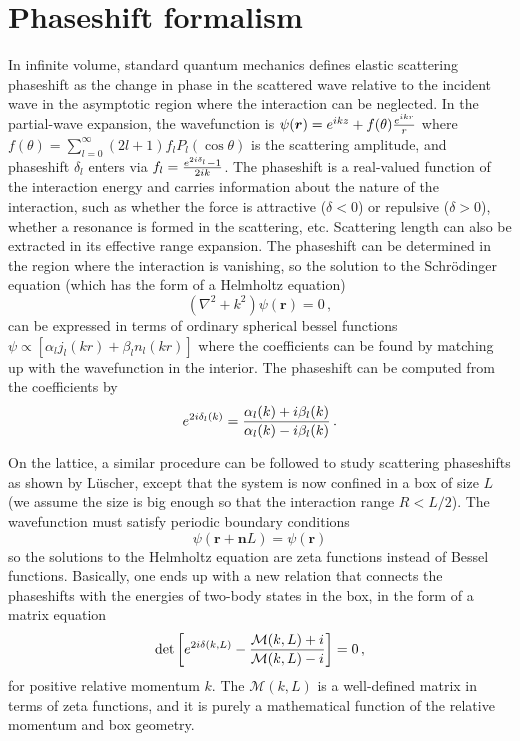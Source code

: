 \documentclass[aps,prd,reprint,showpacs,floatfix,longbibliography,,superscriptaddress]{revtex4-1}
\def\beq{\begin{equation}}
\def\eeq{\end{equation}}
\begin{document}
\section{Phaseshift formalism}

In infinite volume, standard quantum mechanics defines elastic scattering phaseshift as the change in phase 
in the scattered wave relative to the incident wave in the asymptotic region where the interaction can be neglected.
In the partial-wave expansion, the wavefunction is 
$\psi(\bm r) = e^{ikz} + f(\theta) {e^{ikr} \over r}$ where
$f(\theta)=\sum_{l=0}^\infty (2l+1)f_lP_l(\cos\theta)$ is the scattering amplitude, and phaseshift $\delta_l$ enters via $f_l={e^{2i\delta_l}-1 \over 2 i k}$.
The phaseshift is a real-valued function of the interaction energy and carries information about the nature of the interaction, 
such as whether the force is 
attractive ($\delta<0$) or repulsive ($\delta>0$), whether a resonance is formed in the scattering, etc. 
 Scattering length can also be extracted in its effective range expansion.  
The phaseshift can be determined in the region where the interaction is vanishing, so the solution to the 
Schr\"{o}dinger equation (which has the form of a Helmholtz equation)
\beq
(\nabla^2 + k^2) \psi(\bm r)=0\,,
\label{eq:hemholtz}
\eeq
 can be expressed in terms of ordinary spherical bessel functions
$ \psi \propto [   \alpha_l j_l(kr) + \beta_l n_l(kr) ]$ where the coefficients can be found by 
matching up with the wavefunction in the interior.
The phaseshift can be computed from the coefficients by
\beq
e^{2i\delta_l(k)} = {\alpha_l(k) + i \beta_l(k) \over \alpha_l(k) - i \beta_l(k)  }\,.
\eeq

On the lattice, a similar procedure can be followed to study scattering phaseshifts as shown by L\"{u}scher, except that the system is 
now confined in a box of size $L$ (we assume the size is big enough so that  the interaction range $R<L/2$). 
The wavefunction must satisfy periodic boundary conditions 
\beq \psi(\bm r + \bm n L) =\psi(\bm r )\eeq
 so the solutions to 
the Helmholtz equation are zeta functions instead of Bessel functions. 
Basically, one ends up with a new relation that connects the phaseshifts with the
energies of two-body states in the box, 
in the form of a matrix equation~\cite{Luscher:1990ux}
\beq
\det \left [e^{2i\delta(k,L)} - {\mathcal{M}(k,L) + i \over \mathcal{M}(k,L) -i} \right ] =0\,,
\label{eq:phaselat}
\eeq
for positive relative momentum $k$. The $\mathcal{M}(k,L)$ is a well-defined matrix in terms of zeta functions,  
and it is purely a mathematical function of the relative momentum and box geometry.
\end{document}
